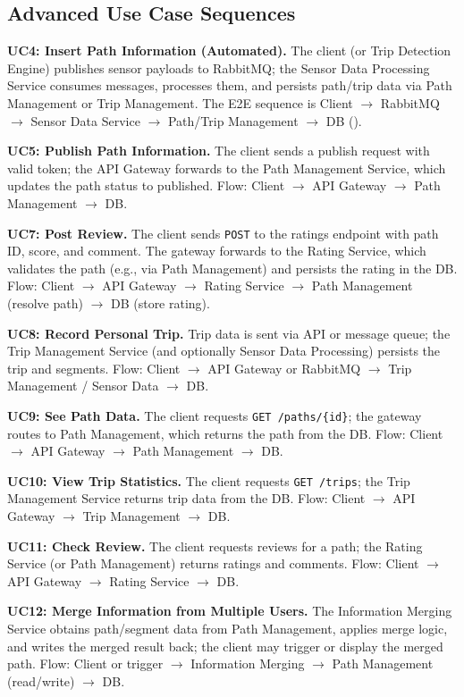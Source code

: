 \subsection{Advanced Use Case Sequences}
\label{subsec:advanced_use_case_sequences}%

\textbf{UC4: Insert Path Information (Automated).} The client (or Trip Detection Engine) publishes sensor payloads to RabbitMQ; the Sensor Data Processing Service consumes messages, processes them, and persists path/trip data via Path Management or Trip Management. The E2E sequence is Client $\to$ RabbitMQ $\to$ Sensor Data Service $\to$ Path/Trip Management $\to$ DB ().

\textbf{UC5: Publish Path Information.} The client sends a publish request with valid token; the API Gateway forwards to the Path Management Service, which updates the path status to published. Flow: Client $\to$ API Gateway $\to$ Path Management $\to$ DB.

\textbf{UC7: Post Review.} The client sends \texttt{POST} to the ratings endpoint with path ID, score, and comment. The gateway forwards to the Rating Service, which validates the path (e.g., via Path Management) and persists the rating in the DB. Flow: Client $\to$ API Gateway $\to$ Rating Service $\to$ Path Management (resolve path) $\to$ DB (store rating).

\textbf{UC8: Record Personal Trip.} Trip data is sent via API or message queue; the Trip Management Service (and optionally Sensor Data Processing) persists the trip and segments. Flow: Client $\to$ API Gateway or RabbitMQ $\to$ Trip Management / Sensor Data $\to$ DB.

\textbf{UC9: See Path Data.} The client requests \texttt{GET /paths/\{id\}}; the gateway routes to Path Management, which returns the path from the DB. Flow: Client $\to$ API Gateway $\to$ Path Management $\to$ DB.

\textbf{UC10: View Trip Statistics.} The client requests \texttt{GET /trips}; the Trip Management Service returns trip data from the DB. Flow: Client $\to$ API Gateway $\to$ Trip Management $\to$ DB.

\textbf{UC11: Check Review.} The client requests reviews for a path; the Rating Service (or Path Management) returns ratings and comments. Flow: Client $\to$ API Gateway $\to$ Rating Service $\to$ DB.

\textbf{UC12: Merge Information from Multiple Users.} The Information Merging Service obtains path/segment data from Path Management, applies merge logic, and writes the merged result back; the client may trigger or display the merged path. Flow: Client or trigger $\to$ Information Merging $\to$ Path Management (read/write) $\to$ DB.

